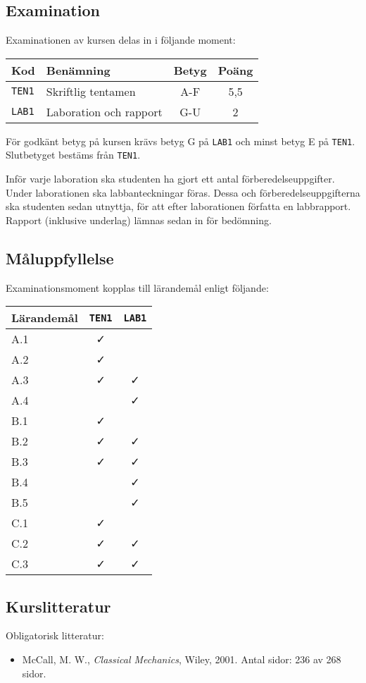 \subsection*{Examination}

Examinationen av kursen delas in i följande moment:

\begin{longtable}[]{@{}llcc@{}}
\toprule
\textsf{Kod} & \textsf{Benämning} & \textsf{Betyg} & \textsf{Poäng}\tabularnewline
\midrule
\endhead
\texttt{TEN1} & Skriftlig tentamen & A-F & 5,5\tabularnewline
\texttt{LAB1} & Laboration och rapport & G-U & 2\tabularnewline
\bottomrule
\end{longtable}

För godkänt betyg på kursen krävs betyg G på \texttt{LAB1} och minst betyg E på
\texttt{TEN1}. Slutbetyget bestäms från \texttt{TEN1}.

Inför varje laboration ska studenten ha gjort ett antal
förberedelseuppgifter. Under laborationen ska labbanteckningar föras.
Dessa och förberedelseuppgifterna ska studenten sedan utnyttja, för att
efter laborationen författa en labbrapport. Rapport (inklusive underlag)
lämnas sedan in för bedömning.

\subsection*{Måluppfyllelse}

Examinationsmoment kopplas till lärandemål enligt följande:

\begin{longtable}[]{@{}lcc@{}}
\toprule
\textsf{Lärandemål} & \texttt{TEN1} & \texttt{LAB1}\tabularnewline
\midrule
\endhead
A.1 & \faCheck &\tabularnewline
A.2 & \faCheck &\tabularnewline
A.3 & \faCheck & \faCheck\tabularnewline
A.4 & & \faCheck\tabularnewline
B.1 & \faCheck &\tabularnewline
B.2 & \faCheck & \faCheck\tabularnewline
B.3 & \faCheck & \faCheck\tabularnewline
B.4 & & \faCheck\tabularnewline
B.5 & & \faCheck\tabularnewline
C.1 & \faCheck &\tabularnewline
C.2 & \faCheck & \faCheck\tabularnewline
C.3 & \faCheck & \faCheck\tabularnewline
\bottomrule
\end{longtable}

\subsection*{Kurslitteratur}

Obligatorisk litteratur:

\begin{itemize}
\tightlist
\item
  McCall, M. W., \emph{Classical Mechanics}, Wiley, 2001. Antal sidor:
  236 av 268 sidor.
\end{itemize}

